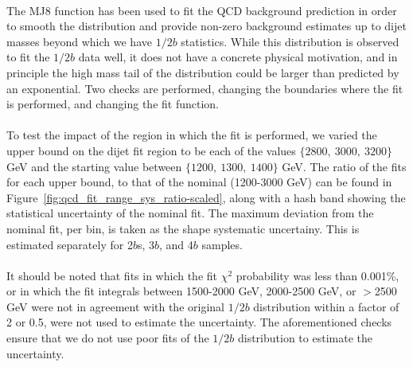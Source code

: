\paragraph{}
The MJ8 function has been used to fit the QCD background prediction in order to smooth the distribution and provide non-zero background estimates up to dijet masses beyond which we have $1/2b$ statistics.  While this distribution is  observed to fit the $1/2b$ data well, it does not have a concrete physical motivation, and in principle the high mass tail of the distribution could be larger than predicted by an exponential.  Two checks are performed, changing the boundaries where the fit is performed, and changing the fit function.

\paragraph{}
To test the impact of the region in which the fit is performed, we varied the upper bound on the dijet fit region to be each of the values $\{2800,\ 3000,\ 3200\}$ GeV and the starting value between $\{1200,\ 1300,\ 1400\}$ GeV.  The ratio of the fits for each upper bound, to that of the nominal (1200-3000 GeV) can be found in Figure~\ref{fig:qcd_fit_range_sys_ratio-scaled}, along with a hash band showing the statistical uncertainty of the nominal fit.  The maximum deviation from the nominal fit, per bin, is taken as the shape systematic uncertainy.  This is estimated separately for 2$b$s, 3$b$, and 4$b$ samples.

\paragraph{}
It should be noted that fits in which the fit $\chi^2$ probability was less than 0.001\%, or in which the fit integrals between 1500-2000 GeV, 2000-2500 GeV, or $>$2500 GeV were not in agreement with the original $1/2b$ distribution within a factor of 2 or 0.5, were not used to estimate the uncertainty.  The aforementioned checks ensure that we do not use poor fits of the $1/2b$ distribution to estimate the uncertainty.



